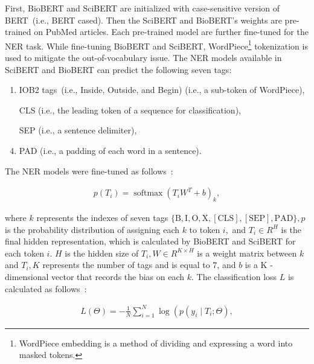 \hspace*{3.5mm} First, BioBERT and SciBERT are initialized with case-sensitive version of BERT~(i.e., BERT cased). Then the SciBERT and BioBERT's weights are pre-trained on PubMed articles. Each pre-trained model are further fine-tuned for the NER task. While fine-tuning BioBERT and SciBERT, WordPiece\footnote{WordPiece embedding is a method of dividing and expressing a word into masked tokens.} tokenization is used to mitigate the out-of-vocabulary issue. The NER models available in SciBERT and BioBERT can predict the following seven tags: 

\begin{enumerate}
    \item IOB2 tags~(i.e., Inside, Outside, and Begin) (i.e., a sub-token of WordPiece), 
    \item [CLS] (i.e., the leading token of a sequence for classification), \item [SEP] (i.e., a sentence delimiter), 
    \item PAD (i.e., a padding of each word in a sentence).
\end{enumerate}

\hspace*{3.5mm} The NER models were fine-tuned as follows~\cite{kim2019neural}:

\begin{align}
    p\left(T_{i}\right)=\operatorname{softmax}\left(T_{i} W^{T}+b\right)_{k},
\end{align}

\hspace*{3.5mm} where $k$ represents the indexes of seven tags $\{\mathrm{B}, \mathrm{I}, \mathrm{O}, \mathrm{X},[\mathrm{CLS}],[\mathrm{SEP}], \mathrm{PAD}\}, p$ is the probability distribution of assigning each $k$ to token $i,$ and $T_{i} \in R^{H}$ is the final hidden representation, which is calculated by BioBERT and SciBERT for each token $i$. $H$ is the hidden size of $T_{i}, W \in R^{K \times H}$ is a weight matrix between $k$ and $T_{i}, K$ represents the number of tags and is equal to $7$, and $b$ is a $\mathrm{K}$ -dimensional vector that records the bias on each $k$. The classification loss $L$ is calculated as follows~\cite{kim2019neural}:

\begin{align}
    L(\Theta)=-\frac{1}{N} \sum_{i=1}^{N} \log \left(p\left(y_{i} \mid T_{i}; \Theta\right)\right. ,
\end{align}


